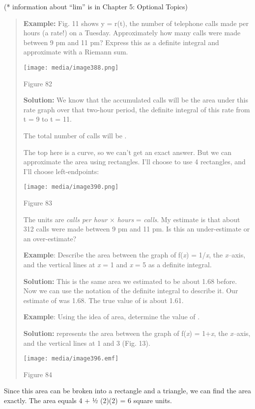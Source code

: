 (* information about ``lim'' is in Chapter 5: Optional Topics)

\begin{quote}
\textbf{Example:} Fig. 11 shows y = r(t), the number of telephone calls
made per hours (a rate!) on a Tuesday. Approximately how many calls were
made between 9 pm and 11 pm? Express this as a definite integral and
approximate with a Riemann sum.

\texttt{[image: media/image388.png]}

Figure 82

\textbf{Solution:} We know that the accumulated calls will be the area
under this rate graph over that two-hour period, the definite integral
of this rate from t = 9 to t = 11.

The total number of calls will be .

The top here is a curve, so we can't get an exact answer. But we can
approximate the area using rectangles. I'll choose to use 4 rectangles,
and I'll choose left-endpoints:

\texttt{[image: media/image390.png]}

Figure 83

The units are \emph{calls per hour} × \emph{hours} = \emph{calls}. My
estimate is that about 312 calls were made between 9 pm and 11 pm. Is
this an under-estimate or an over-estimate?

\textbf{Example}: Describe the area between the graph of f(\emph{x}) =
1/\emph{x}, the \emph{x}--axis, and the vertical lines at \emph{x} = 1
and \emph{x} = 5 as a definite integral.

\textbf{Solution:} This is the same area we estimated to be about 1.68
before. Now we can use the notation of the definite integral to describe
it. Our estimate of was 1.68. The true value of is about 1.61.

\textbf{Example}: Using the idea of area, determine the value of .

\textbf{Solution:} represents the area between the graph of f(\emph{x})
= 1+\emph{x}, the \emph{x}--axis, and the vertical lines at 1 and 3
(Fig. 13).

\texttt{[image: media/image396.emf]}

Figure 84
\end{quote}

Since this area can be broken into a rectangle and a triangle, we can
find the area exactly. The area equals 4 + ½ (2)(2) = 6 square units.

